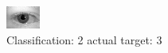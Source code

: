 \begin{figure}[h!]
\begin{center}
\includegraphics[width=0.60\columnwidth]{figures/ID607_class_2_target_3.png}
\end{center}
\caption{ Classification: 2 actual target: 3}
\label{fig:ID607_class_2_target_3}
\end{figure}

